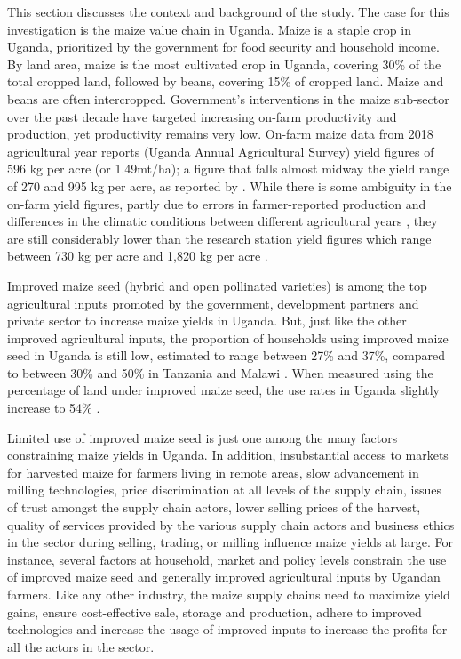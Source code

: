 \documentclass[12pt,english]{article}\usepackage[]{graphicx}\usepackage[]{color}
\begin{document}
\begin{onehalfspace}
This section discusses the context and background of the study. The
case for this investigation is the maize value chain in Uganda. Maize
is a staple crop in Uganda, prioritized by the government for food
security and household income. By land area, maize is the most cultivated
crop in Uganda, covering 30\% of the total cropped land, followed
by beans, covering 15\% of cropped land. Maize and beans are often
intercropped. Government\textquoteright s interventions in the maize
sub-sector over the past decade have targeted increasing on-farm productivity
and production, yet productivity remains very low. On-farm maize data
from 2018 agricultural year reports (Uganda Annual Agricultural Survey)
yield figures of 596 kg per acre (or 1.49mt/ha); a figure that falls
almost midway the yield range of 270 and 995 kg per acre, as reported
by \citet{Gourlay2019}. While there is some ambiguity in the on-farm
yield figures, partly due to errors in farmer-reported production
\citep{Gourlay2019} and differences in the climatic conditions between
different agricultural years \citep{VanCampenhout2020}, they are
still considerably lower than the research station yield figures which
range between 730 kg per acre and 1,820 kg per acre \citep{Fermont2011}.

Improved maize seed (hybrid and open pollinated varieties) is among
the top agricultural inputs promoted by the government, development
partners and private sector to increase maize yields in Uganda. But,
just like the other improved agricultural inputs, the proportion of
households using improved maize seed in Uganda is still low, estimated
to range between 27\% and 37\%, compared to between 30\% and 50\%
in Tanzania and Malawi \citep{VanCampenhout2020}. When measured using
the percentage of land under improved maize seed, the use rates in
Uganda slightly increase to 54\% \citep{Sheahan2017}. 

Limited use of improved maize seed is just one among the many factors
constraining maize yields in Uganda. In addition, insubstantial access
to markets for harvested maize for farmers living in remote areas,
slow advancement in milling technologies, price discrimination at
all levels of the supply chain, issues of trust amongst the supply
chain actors, lower selling prices of the harvest, quality of services
provided by the various supply chain actors and business ethics in
the sector during selling, trading, or milling influence maize yields
at large. For instance, several factors at household, market and policy
levels constrain the use of improved maize seed and generally improved
agricultural inputs by Ugandan farmers. Like any other industry, the
maize supply chains need to maximize yield gains, ensure cost-effective
sale, storage and production, adhere to improved technologies and
increase the usage of improved inputs to increase the profits for
all the actors in the sector. 
\end{onehalfspace}
\end{document}
